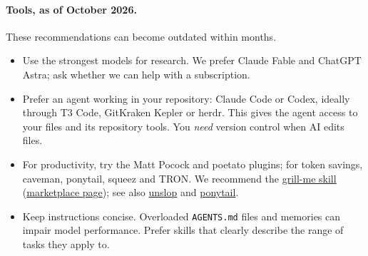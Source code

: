 \paragraph{Tools, as of October 2026.} These recommendations can become outdated within months.
\begin{itemize}
  \item Use the strongest models for research. We prefer Claude Fable and ChatGPT Astra; ask whether we can help with a subscription.
  \item Prefer an agent working in your repository: Claude Code or Codex, ideally through T3 Code, GitKraken Kepler or herdr. This gives the agent access to your files and its repository tools. You \emph{need} version control when AI edits files.
  \item For productivity, try the Matt Pocock and poetato plugins; for token savings, caveman, ponytail, squeez and TRON. We recommend the \href{https://www.aihero.dev/skills-grill-me}{grill-me skill} (\href{https://claudemarketplaces.com/skills/mattpocock/skills/grill-me}{marketplace page}); see also \href{https://github.com/cursor/plugins/blob/main/pstack/skills/unslop/SKILL.md}{unslop} and \href{https://github.com/DietrichGebert/ponytail/blob/main/skills/ponytail/SKILL.md}{ponytail}.
  \item Keep instructions concise. Overloaded \texttt{AGENTS.md} files and memories can impair model performance. Prefer skills that clearly describe the range of tasks they apply to.
\end{itemize}
